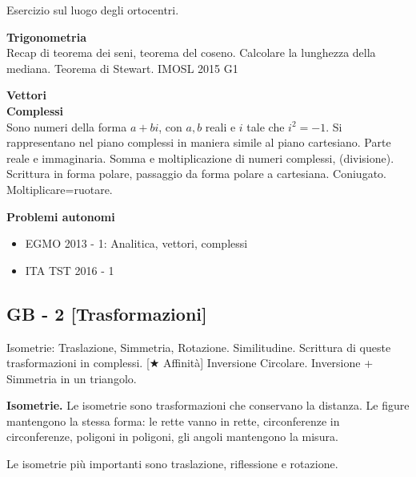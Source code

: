 \vspace{0.3cm}

Esercizio sul luogo degli ortocentri.


\textbf{Trigonometria}\\
Recap di teorema dei seni, teorema del coseno. Calcolare la lunghezza della mediana. Teorema di Stewart. 
IMOSL 2015 G1

\vspace{0.4cm}
\textbf{Vettori}\\


\vspace{0.4cm}
\textbf{Complessi}\\
Sono numeri della forma $a+bi$, con $a,b$ reali e $i$ tale che $i^2=-1$. Si rappresentano nel piano complessi in maniera simile al piano cartesiano. Parte reale e immaginaria. Somma e moltiplicazione di numeri complessi, (divisione).\\
Scrittura in forma polare, passaggio da forma polare a cartesiana. Coniugato. Moltiplicare=ruotare. 


\vspace{0.4cm}
\Large \textbf{Problemi autonomi}\normalsize
\begin{itemize}
 \item EGMO 2013 - 1: Analitica, vettori, complessi
 \item ITA TST 2016 - 1
\end{itemize}





\subsection{GB - 2 [Trasformazioni]}


\begin{short}
Isometrie: Traslazione, Simmetria, Rotazione. Similitudine. Scrittura di queste trasformazioni in complessi. [$\bigstar$ Affinità] 
Inversione Circolare. Inversione + Simmetria in un triangolo.
\end{short}



\vspace{0.3cm}
\textbf{Isometrie. }Le isometrie sono trasformazioni che conservano la distanza. Le figure mantengono la stessa forma: le rette vanno in rette, circonferenze in circonferenze, poligoni in poligoni, gli angoli mantengono la misura. 

Le isometrie più importanti sono traslazione, riflessione e rotazione. 

